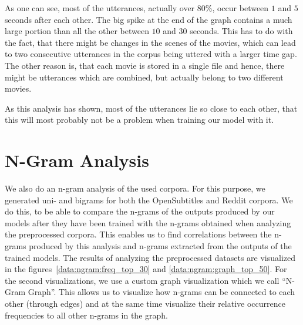 As one can see, most of the utterances, actually over 80\%, occur between $1$ and $5$ seconds after each other. The big spike at the end of the graph contains a much large portion than all the other between $10$ and $30$ seconds. This has to do with the fact, that there might be changes in the scenes of the movies, which can lead to two consecutive utterances in the corpus being uttered with a larger time gap. The other reason is, that each movie is stored in a single file and hence, there might be utterances which are combined, but actually belong to two different movies.

As this analysis has shown, most of the utterances lie so close to each other, that this will most probably not be a problem when training our model with it.

\section{N-Gram Analysis}
\label{chapter:data:ngram}
We also do an n-gram analysis of the used corpora. For this purpose, we generated uni- and bigrams for both the OpenSubtitles and Reddit corpora. We do this, to be able to compare the n-grams of the outputs produced by our models after they have been trained with the n-grams obtained when analyzing the preprocessed corpora. This enables us to find correlations between the n-grams produced by this analysis and n-grams extracted from the outputs of the trained models. The results of analyzing the preprocessed datasets are visualized in the figures~\ref{data:ngram:freq_top_30} and \ref{data:ngram:graph_top_50}. For the second visualizations, we use a custom graph visualization which we call ``N-Gram Graph''. This allows us to visualize how n-grams can be connected to each other (through edges) and at the same time visualize their relative occurrence frequencies to all other n-grams in the graph.
 
